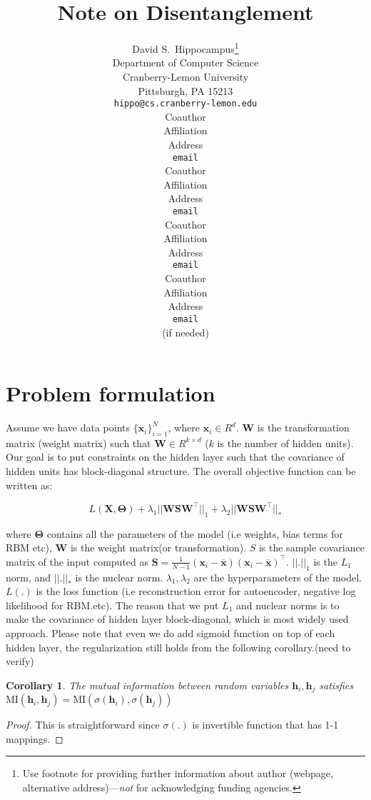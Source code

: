 \documentclass{article} %
\title{Note on Disentanglement}
\author{
David S.~Hippocampus\thanks{ Use footnote for providing further information
about author (webpage, alternative address)---\emph{not} for acknowledging
funding agencies.} \\
Department of Computer Science\\
Cranberry-Lemon University\\
Pittsburgh, PA 15213 \\
\texttt{hippo@cs.cranberry-lemon.edu} \\
\And
Coauthor \\
Affiliation \\
Address \\
\texttt{email} \\
\AND
Coauthor \\
Affiliation \\
Address \\
\texttt{email} \\
\And
Coauthor \\
Affiliation \\
Address \\
\texttt{email} \\
\And
Coauthor \\
Affiliation \\
Address \\
\texttt{email} \\
(if needed)\\
}
\newtheorem{corollary}{Corollary}[theorem]
\begin{document}
\maketitle

\begin{abstract}

\end{abstract}




\section{Problem formulation}
Assume we have data points $\{\mathbf{x}_i\}_{i=1}^{N}$, where $\mathbf{x}_i\in R^d$. $\mathbf{W}$ is the transformation matrix (weight matrix) such that $\mathbf{W}\in R^{k\times d}$ ($k$ is the number of hidden units). Our goal is to put constraints on the hidden layer such that the covariance of hidden units has block-diagonal structure. The overall objective function can be written as:

\begin{equation}
L(\mathbf{X},\mathbf{\Theta}) + \lambda_1||\mathbf{W}\mathbf{S}\mathbf{W}^\top||_1 + \lambda_2||\mathbf{W}\mathbf{S}\mathbf{W}^\top||_*
\end{equation}

where $\mathbf{\Theta}$ contains all the parameters of the model (i.e weights, bias terms for RBM etc), $\mathbf{W}$ is the weight matrix(or transformation). $S$ is the sample covariance matrix of the input computed as $\mathbf{S}=\frac{1}{N-1}(\mathbf{x}_i-\overline{\mathbf{x}})(\mathbf{x}_i-\overline{\mathbf{x}})^{\top}$. $||.||_{1}$ is the $L_1$ norm, and $||.||_*$ is the nuclear norm.  $\lambda_1, \lambda_2$ are the hyperparameters of the model. $L(.)$ is the loss function (i.e reconstruction error for autoencoder, negative log likelihood for RBM.etc). The reason that we put $L_1$ and nuclear norms is to make the covariance of hidden layer block-diagonal, which is most widely used approach. Please note that even we do add sigmoid function on top of each hidden layer, the regularization still holds from the following corollary.(need to verify)

\begin{corollary}
The mutual information between random variables $\mathbf{h}_i, \mathbf{h}_j$ satisfies $\text{MI}(\mathbf{h}_i, \mathbf{h}_j) = \text{MI}(\sigma(\mathbf{h}_i), \sigma(\mathbf{h}_j))$
\end{corollary}
\begin{proof}
This is straightforward since $\sigma(.)$ is invertible function that has 1-1 mappings.
\end{proof}
\end{document}

